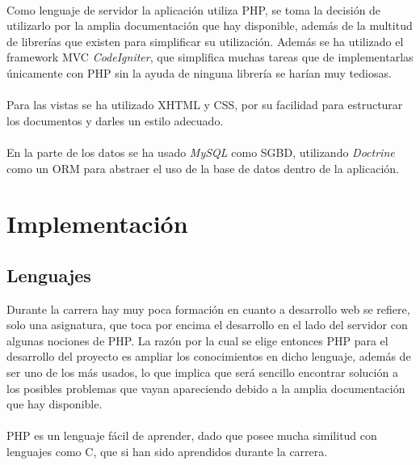 \documentclass[a4paper,11pt]{article} %
\begin{document}
\paragraph{}
Como lenguaje de servidor la aplicación utiliza PHP, se toma la decisión de utilizarlo por la amplia documentación que hay disponible, además de la multitud de librerías que existen para simplificar su utilización. Además se ha utilizado el framework MVC {\em CodeIgniter}, que simplifica muchas tareas que de implementarlas únicamente con PHP sin la ayuda de ninguna librería se harían muy tediosas.
\paragraph{}
Para las vistas se ha utilizado XHTML y CSS, por su facilidad para estructurar los documentos y darles un estilo adecuado.
\paragraph{}

En la parte de los datos se ha usado {\em MySQL} como SGBD, utilizando {\em Doctrine} como un ORM para abstraer el uso de la base de datos dentro de la aplicación.


\section{Implementación}


\subsection{Lenguajes}

Durante la carrera hay muy poca formación en cuanto a desarrollo web se refiere, solo una asignatura, que toca por encima el desarrollo en el lado del servidor con algunas nociones de PHP. La razón por la cual se elige entonces PHP para el desarrollo del proyecto es ampliar los conocimientos en dicho lenguaje, además de ser uno de los más usados, lo que implica que será sencillo encontrar solución a los posibles problemas que vayan apareciendo debido a la amplia documentación que hay disponible.
\paragraph{}
PHP es un lenguaje fácil de aprender, dado que posee mucha similitud con lenguajes como C, que si han sido aprendidos durante la carrera.
\end{document}
